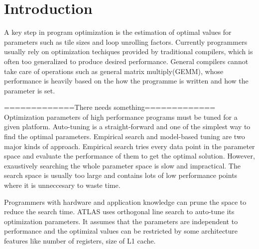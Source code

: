 \section{Introduction}
\label{sec:intro}

A key step in program optimization is the estimation of optimal values for
parameters such as tile sizes and loop unrolling factors. Currently programmers
usually rely on optimization techiques provided by traditional compilers, which
is often too generalized to produce desired performance. General compilers
cannot take care of operations such as general matrix multiply(GEMM), whose
performance is heavily based on the how the programme is written and how the
parameter is set.
\par
=============There needs something=============
Optimization parameters of high performance programs must be tuned for a given platform. 
Auto-tuning is a straight-forward and one of the simplest way to find the optimal parameters.
Empirical search and model-based tuning are two major kinds of approach. 
Empirical search tries every data point in the parameter space and evaluate the performance of
them to get the optimal solution. 
However, exaustively searching the whole parameter space is slow and impractical. 
The search space is usually too large and contains lots of low performance points where
it is unneccesary to waste time. 
\par
Programmers with hardware and application knowledge can prune the space to reduce the search time.
ATLAS uses orthogonal line search to auto-tune its optimization parameters. 
It assumes that the parameters are independent to performance and the optimizal values can be 
restricted by some architecture features like number of registers, size of L1 cache. 




